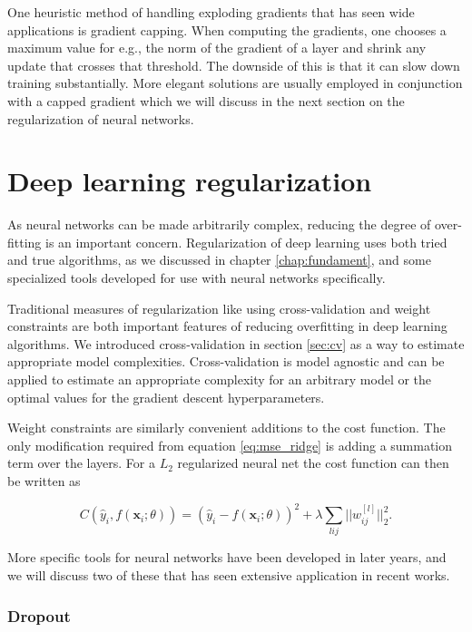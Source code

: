 One heuristic method of handling exploding gradients that has seen wide applications is gradient capping. When computing the gradients, one chooses a maximum value for e.g., the norm of the gradient of a layer and shrink any update that crosses that threshold. The downside of this is that it can slow down training substantially. More elegant solutions are usually employed in conjunction with a capped gradient which we will discuss in the next section on the regularization of neural networks. 


\section{Deep learning regularization}

As neural networks can be made arbitrarily complex, reducing the degree of over-fitting is an important concern. Regularization of deep learning uses both tried and true algorithms, as we discussed in chapter \ref{chap:fundament}, and some specialized tools developed for use with neural networks specifically. 

Traditional measures of regularization like using cross-validation and weight constraints are both important features of reducing overfitting in deep learning algorithms. We introduced cross-validation in section \ref{sec:cv} as a way to estimate appropriate model complexities. Cross-validation is model agnostic and can be applied to estimate an appropriate complexity for an arbitrary model or the optimal values for the gradient descent hyperparameters. 

Weight constraints are similarly convenient additions to the cost function. The only modification required from equation \ref{eq:mse_ridge} is adding a summation term over the layers. For a $L_2$ regularized neural net the cost function can then be written as 

\begin{equation}
C(\hat{y}_i, f(\mathbf{x}_i; \theta)) = (\hat{y}_i - f(\mathbf{x}_i; \theta))^2 + \lambda\sum_{lij}||w_{ij}^{[l]}||^2_2.
\end{equation}

\noindent More specific tools for neural networks have been developed in later years, and we will discuss two of these that has seen extensive application in recent works. 

\subsubsection{Dropout}\label{sec:dropout}

